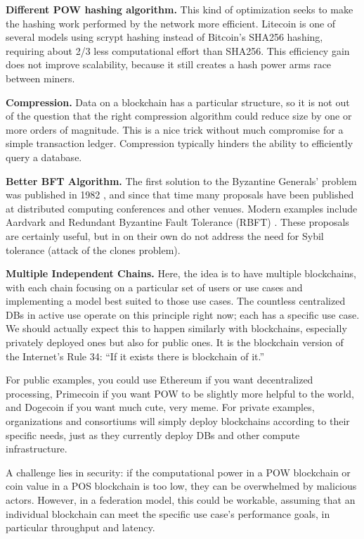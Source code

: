 \medskip
\noindent\textbf{Different POW hashing algorithm.} This kind of optimization seeks to make the hashing work performed by the network more efficient. 
Litecoin is one of several models using scrypt hashing instead of Bitcoin’s SHA256 hashing, requiring about 2/3 less computational effort than SHA256. 
This efficiency gain does not improve scalability, because it still creates a hash power arms race between miners.

\medskip
\noindent\textbf{Compression.} Data on a blockchain has a particular structure, so it is not out of the question that the right compression algorithm could reduce size by one or more orders of magnitude. 
This is a nice trick without much compromise for a simple transaction ledger. 
Compression typically hinders the ability to efficiently query a database.

\medskip
\noindent\textbf{Better BFT Algorithm.} The first solution to the Byzantine Generals’ problem was published in 1982 \cite{lamport1982byzantine}, and since that time many proposals have been published at distributed computing conferences and other venues. 
Modern examples include Aardvark \cite{clement2009making} and Redundant Byzantine Fault Tolerance (RBFT) \cite{aublin2013rbft}. 
These proposals are certainly useful, but in on their own do not address the need for Sybil tolerance (attack of the clones problem).

\medskip
\noindent\textbf{Multiple Independent Chains.} Here, the idea is to have multiple blockchains, with each chain focusing on a particular set of users or use cases and implementing a model best suited to those use cases. 
The countless centralized DBs in active use operate on this principle right now; each has a specific use case. 
We should actually expect this to happen similarly with blockchains, especially privately deployed ones but also for public ones. 
It is the blockchain version of the Internet’s Rule 34: “If it exists there is blockchain of it.”

For public examples, you could use Ethereum if you want decentralized processing, Primecoin if you want POW to be slightly more helpful to the world, and Dogecoin if you want much cute, very meme. 
For private examples, organizations and consortiums will simply deploy blockchains according to their specific needs, just as they currently deploy DBs and other compute infrastructure.

A challenge lies in security: if the computational power in a POW blockchain or coin value in a POS blockchain is too low, they can be overwhelmed by malicious actors. 
However, in a federation model, this could be workable, assuming that an individual blockchain can meet the specific use case’s performance goals, in particular throughput and latency.

